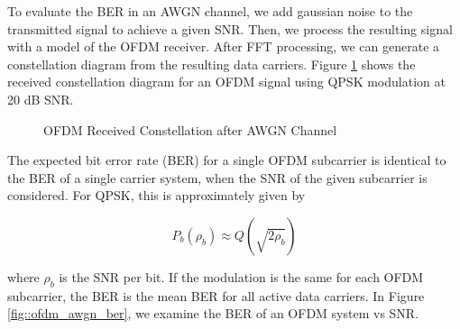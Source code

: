 \documentclass[conference]{IEEEtran}
\begin{document}
    To evaluate the BER in an AWGN channel, we add gaussian noise to the transmitted signal to achieve a given SNR. Then, we process the resulting signal with a model of the OFDM receiver. After FFT processing, we can generate a constellation diagram from the resulting data carriers. Figure \ref{fig::rx_constellation_diagram} shows the received constellation diagram for an OFDM signal using QPSK modulation at 20 dB SNR.
      
      \begin{figure}[H]
		\centering
    		\caption{OFDM Received Constellation after AWGN Channel}
    		\label{fig::rx_constellation_diagram}
  	  \end{figure}
    
    		The expected bit error rate (BER) for a single OFDM subcarrier is identical to the BER of a single carrier system, when the SNR of the given subcarrier is considered. For QPSK, this is approximately given by
		
		\begin{equation}
			P_b(\rho_b) \approx Q(\sqrt{2\rho_b})
		\end{equation}
		
		where $\rho_b$ is the SNR per bit. If the modulation is the same for each OFDM subcarrier, the BER is the mean BER for all active data carriers. In Figure \ref{fig::ofdm_awgn_ber}, we examine the BER of an OFDM system vs SNR.
		
\end{document}

